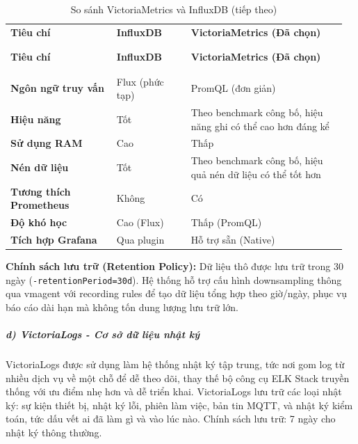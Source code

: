\documentclass[a4paper]{extarticle}
\newcommand{\thesissettableid}[2]{%
  \renewcommand{\thetable}{#1}%
  \renewcommand{\theHtable}{#2}%
}
\begin{document}
{\thesissettableid{3.20}{tab-ch3-so-sanh-victoriametrics-va-influxdb}
\def\LTcaptype{table}
\begin{longtable}{|L{0.307\linewidth}|L{0.210\linewidth}|L{0.447\linewidth}|}
\caption{So sánh VictoriaMetrics và InfluxDB}\label{tab:ch3-so-sanh-victoriametrics-va-influxdb}\\
\hline \textbf{Tiêu chí} & \textbf{InfluxDB} & \textbf{VictoriaMetrics (Đã chọn)} \\
\\\hline
\endfirsthead
\caption[]{So sánh VictoriaMetrics và InfluxDB (tiếp theo)}\\
\hline \textbf{Tiêu chí} & \textbf{InfluxDB} & \textbf{VictoriaMetrics (Đã chọn)} \\
\\\hline
\endhead
\\\hline
\endfoot
\endlastfoot
\textbf{Ngôn ngữ truy vấn} & Flux (phức tạp) & PromQL (đơn giản) \\\hline
\textbf{Hiệu năng} & Tốt & Theo benchmark công bố, hiệu năng ghi có thể cao hơn đáng kể \\\hline
\textbf{Sử dụng RAM} & Cao & Thấp \\\hline
\textbf{Nén dữ liệu} & Tốt & Theo benchmark công bố, hiệu quả nén dữ liệu có thể tốt hơn \\\hline
\textbf{Tương thích Prometheus} & Không & Có \\\hline
\textbf{Độ khó học} & Cao (Flux) & Thấp (PromQL) \\\hline
\textbf{Tích hợp Grafana} & Qua plugin & Hỗ trợ sẵn (Native) \\\hline
\end{longtable}
}


\textbf{Chính sách lưu trữ (Retention Policy):} Dữ liệu thô được lưu trữ
trong 30 ngày (\texttt{-retentionPeriod=30d}). Hệ thống hỗ trợ cấu hình
downsampling thông qua vmagent với recording rules để tạo dữ liệu tổng
hợp theo giờ/ngày, phục vụ báo cáo dài hạn mà không tốn dung lượng lưu
trữ lớn.

\subparagraph{d) VictoriaLogs - Cơ sở dữ liệu nhật
ký}\label{d-victorialogs---cux1a1-sux1edf-dux1eef-liux1ec7u-nhux1eadt-kuxfd}

VictoriaLogs được sử dụng làm hệ thống nhật ký tập trung, tức nơi gom log
từ nhiều dịch vụ về một chỗ để dễ theo dõi, thay thế bộ công cụ ELK
Stack truyền thống với ưu điểm nhẹ hơn và dễ triển khai. VictoriaLogs
lưu trữ các loại nhật ký: sự kiện thiết bị, nhật ký lỗi, phiên làm việc,
bản tin MQTT, và nhật ký kiểm toán,
tức dấu vết ai đã làm gì và vào lúc nào. Chính sách lưu trữ: 7 ngày cho nhật ký thông thường.
\end{document}
